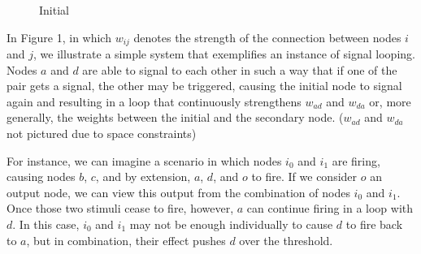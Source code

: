 \documentclass[12pt]{article}
\begin{document}
\begin{figure}[H]
    \centering
    \caption{Initial} \label{fig:Initial}
\end{figure}

In Figure 1, in which $w_{ij}$ denotes the strength of the connection between nodes $i$ and $j$, we illustrate a simple system that exemplifies an instance of signal looping.  Nodes $a$ and $d$ are able to signal to each other in such a way that if one of the pair gets a signal, the other may be triggered, causing the initial node to signal again and resulting in a loop that continuously strengthens $w_{ad}$ and $w_{da}$ or, more generally, the weights between the initial and the secondary node. ($w_{ad}$ and $w_{da}$ not pictured due to space constraints)

For instance, we can imagine a scenario in which nodes $i_0$ and $i_1$ are firing, causing nodes $b$, $c$, and by extension, $a$, $d$, and $o$ to fire.  If we consider $o$ an output node, we can view this output from the combination of nodes $i_0$ and $i_1$.  Once those two stimuli cease to fire, however, $a$ can continue firing in a loop with $d$.  In this case, $i_0$ and $i_1$ may not be enough individually to cause $d$ to fire back to $a$, but in combination, their effect pushes $d$ over the threshold.
\end{document}
